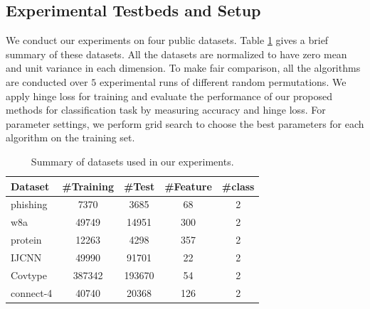 \documentclass[letterpaper]{article} %
\begin{document}
\subsection{Experimental Testbeds and Setup}
We conduct our experiments on four public datasets. Table \ref{tab0} gives a brief summary of these datasets. All the datasets are normalized to have zero mean and unit variance in each dimension. To make fair comparison, all the algorithms are conducted over $5$ experimental runs of different random permutations. We apply hinge loss for training and evaluate the performance of our proposed methods for classification task by measuring accuracy and hinge loss. For parameter settings, we perform grid search to choose the best parameters for each algorithm on the training set.
\begin{table}[htb]
	\centering
		\begin{tabular} {|l|c|c|c|c|}
			\hline
			Dataset & \#Training & \#Test & \#Feature   & \#class \\
			\hline
			phishing	& 7370		& 3685		& 68	& 2\\
			w8a			& 49749		& 14951		& 300	& 2\\
			protein		& 12263		& 4298		& 357	& 2\\
			IJCNN       & 49990     & 91701     & 22	& 2\\
			Covtype		& 387342	& 193670	& 54	& 2\\
			connect-4	& 40740		& 20368		& 126	& 2\\
			\hline
		\end{tabular}
	\caption{Summary of datasets used in our experiments.}
	\label{tab0}
\end{table}
\end{document}
